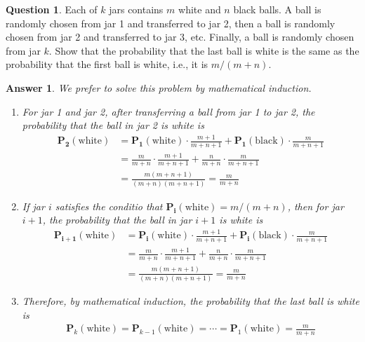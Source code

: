 \documentclass[utf8]{article}
\theoremstyle{definition}%
\newtheorem{question}{Question} %
\theoremstyle{plain}%
\newtheorem{answer}{Answer} %
\begin{document}
\begin{question}
    Each of $k$ jars contains $m$ white and $n$ black balls. A ball is randomly chosen from jar 1 and transferred to jar 2, then a ball is randomly chosen from jar 2 and transferred to jar 3, etc. Finally, a ball is randomly chosen from jar $k$. Show that the probability that the last ball is white is the same as the probability that the first ball is white, i.e., it is $m/\left(m + n\right)$.
\end{question}
\begin{answer}
    We prefer to solve this problem by mathematical induction. 
    \begin{enumerate}
        \item For jar 1 and jar 2, after transferring a ball from jar 1 to jar 2, the probability that the ball in jar 2 is white is 
        \begin{align*}
            \mathbf{P_2}\left(\text{white}\right) &= \mathbf{P_1}\left(\text{white}\right) \cdot \frac{m + 1}{m + n + 1} + \mathbf{P_1}\left(\text{black}\right) \cdot \frac{m}{m + n + 1} \\ 
            &= \frac{m}{m + n} \cdot \frac{m + 1}{m + n + 1} + \frac{n}{m + n} \cdot \frac{m}{m + n + 1} \\ 
            &= \frac{m\left(m + n + 1\right)}{\left(m + n\right)\left(m + n + 1\right)} = \frac{m}{m + n}
        \end{align*}
        \item If jar $i$ satisfies the conditio that $\mathbf{P_i}\left( \text{white} \right) = m/\left(m + n\right)$, then for jar $i + 1$, the probability that the ball in jar $i + 1$ is white is
        \begin{align*}
            \mathbf{P_{i+1}}\left(\text{white}\right) &= \mathbf{P_i}\left(\text{white}\right) \cdot \frac{m + 1}{m + n + 1} + \mathbf{P_i}\left(\text{black}\right) \cdot \frac{m}{m + n + 1} \\ 
            &= \frac{m}{m + n} \cdot \frac{m + 1}{m + n + 1} + \frac{n}{m + n} \cdot \frac{m}{m + n + 1} \\ 
            &= \frac{m\left(m + n + 1\right)}{\left(m + n\right)\left(m + n + 1\right)} = \frac{m}{m + n}
        \end{align*}
        \item Therefore, by mathematical induction, the probability that the last ball is white is 
        \begin{align*}
            \mathbf{P}_k\left(\text{white}\right) = \mathbf{P}_{k-1}\left(\text{white}\right) = \cdots = \mathbf{P}_1\left(\text{white}\right) = \frac{m}{m + n}
        \end{align*}
    \end{enumerate}
\end{answer}
\end{document}
